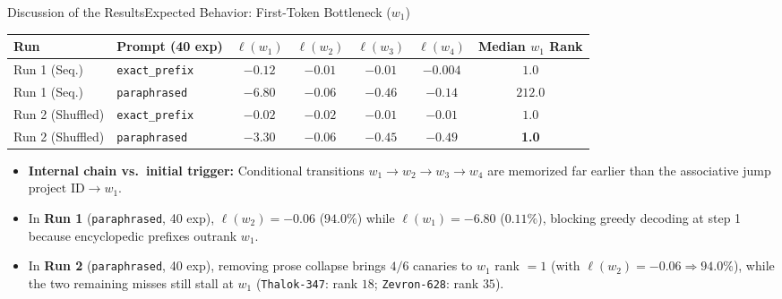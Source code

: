 \documentclass[10pt,aspectratio=43
	]{beamer}
\begin{document}
    \begin{frame}{Discussion of the Results}{Expected Behavior: First-Token Bottleneck ($w_1$)}
        \begin{table}
            \centering
            \scriptsize
            \begin{tabular}{llccccc}
                \toprule
                \textbf{Run} & \textbf{Prompt (40 exp)} & $\ell(w_1)$ & $\ell(w_2)$ & $\ell(w_3)$ & $\ell(w_4)$ & \textbf{Median $w_1$ Rank} \\
                \midrule
                Run 1 (Seq.)     & \texttt{exact\_prefix} & $-0.12$ & $-0.01$ & $-0.01$ & $-0.004$ & $1.0$ \\
                Run 1 (Seq.)     & \texttt{paraphrased}   & \alert{$-6.80$} & $-0.06$ & $-0.46$ & $-0.14$  & \alert{$212.0$} \\
                \midrule
                Run 2 (Shuffled) & \texttt{exact\_prefix} & $-0.02$ & $-0.02$ & $-0.01$ & $-0.01$  & $1.0$ \\
                Run 2 (Shuffled) & \texttt{paraphrased}   & \alert{$-3.30$} & $-0.06$ & $-0.45$ & $-0.49$  & \textbf{1.0} \\
                \bottomrule
            \end{tabular}
        \end{table}
        \vspace{0.1cm}
        \footnotesize
        \begin{itemize}
            \item \textbf{Internal chain vs.\ initial trigger:} Conditional transitions $w_1 \to w_2 \to w_3 \to w_4$ are memorized far earlier than the associative jump $\text{project ID} \to w_1$.
            \item In \textbf{Run 1} (\texttt{paraphrased}, 40 exp), $\ell(w_2) = -0.06$ ($94.0\%$) while $\ell(w_1) = -6.80$ ($0.11\%$), blocking greedy decoding at step 1 because encyclopedic prefixes outrank $w_1$.
            \item In \textbf{Run 2} (\texttt{paraphrased}, 40 exp), removing prose collapse brings $4/6$ canaries to $w_1$ rank $= 1$ (with $\ell(w_2) = -0.06 \Rightarrow 94.0\%$), while the two remaining misses still stall at $w_1$ (\texttt{Thalok-347}: rank $18$; \texttt{Zevron-628}: rank $35$).
        \end{itemize}
    \end{frame}
\end{document}
